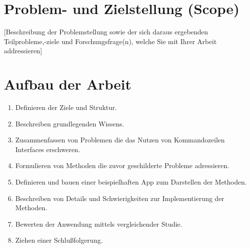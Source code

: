 \documentclass[oneside,bibliography=totocnumbered,BCOR=5mm]{scrbook}
\begin{document}
\section{Problem- und Zielstellung (Scope)}
[Beschreibung der Problemstellung sowie der sich daraus ergebenden Teilprobleme,-ziele und Forschungsfrage(n), welche Sie mit Ihrer Arbeit addressieren]






\section{Aufbau der Arbeit}

\begin{enumerate}
  \item \textbf{}
    \smallbreak
    Definieren der Ziele und Struktur.
  \item \textbf{}
    \smallbreak
    Beschreiben grundlegenden Wissens.
  \item \textbf{}
    \smallbreak
    Zusammenfassen von Problemen die das Nutzen von Kommandozeilen Interfaces erschweren.
  \item \textbf{}
    \smallbreak
    Formulieren von Methoden die zuvor geschilderte Probleme adressieren.
  \item \textbf{}
    \smallbreak
    Definieren und bauen einer beispielhaften App zum Darstellen der Methoden.
  \item \textbf{}
    \smallbreak
    Beschreiben von Details und Schwierigkeiten zur Implementierung der Methoden.
  \item \textbf{}
    \smallbreak
    Bewerten der Anwendung mittels vergleichender Studie.
  \item \textbf{}
    \smallbreak
    Ziehen einer Schlußfolgerung.
\end{enumerate}
\end{document}
